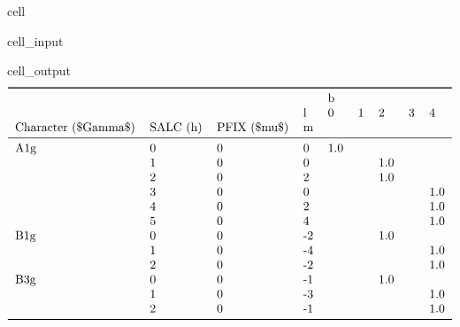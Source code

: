 \documentclass[letterpaper,table,10pt,english]{jupyterBook}
\begin{document}
\begin{sphinxuseclass}{cell}\begin{sphinxVerbatimInput}

\begin{sphinxuseclass}{cell_input}
\begin{sphinxVerbatim}[commandchars=\\\{\}]
    
\end{sphinxVerbatim}

\end{sphinxuseclass}\end{sphinxVerbatimInput}
\begin{sphinxVerbatimOutput}

\begin{sphinxuseclass}{cell_output}\begin{equation*}
\begin{split}\begin{tabular}{lllllllll}
\toprule
    &   &   & {} & \multicolumn{5}{l}{b} \\
    &   &   & l &    0 & 1 &    2 & 3 &    4 \\
Character (\$\textbackslash Gamma\$) & SALC (h) & PFIX (\$\textbackslash mu\$) & m &      &   &      &   &      \\
\midrule
A1g & 0 & 0 &  0 &  1.0 &   &      &   &      \\
    & 1 & 0 &  0 &      &   &  1.0 &   &      \\
    & 2 & 0 &  2 &      &   &  1.0 &   &      \\
    & 3 & 0 &  0 &      &   &      &   &  1.0 \\
    & 4 & 0 &  2 &      &   &      &   &  1.0 \\
    & 5 & 0 &  4 &      &   &      &   &  1.0 \\
B1g & 0 & 0 & -2 &      &   &  1.0 &   &      \\
    & 1 & 0 & -4 &      &   &      &   &  1.0 \\
    & 2 & 0 & -2 &      &   &      &   &  1.0 \\
B3g & 0 & 0 & -1 &      &   &  1.0 &   &      \\
    & 1 & 0 & -3 &      &   &      &   &  1.0 \\
    & 2 & 0 & -1 &      &   &      &   &  1.0 \\
\bottomrule
\end{tabular}\end{split}
\end{equation*}
\end{sphinxuseclass}\end{sphinxVerbatimOutput}

\end{sphinxuseclass}
\sphinxstepscope
\end{document}
